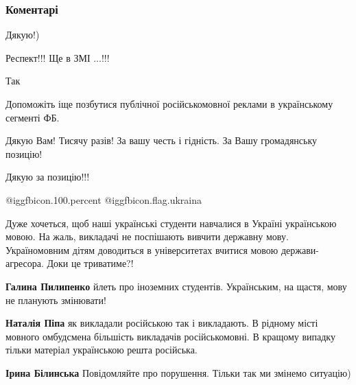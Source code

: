  
 
 
 
 
\subsubsection{Коментарі}

\begin{itemize} %
Дякую!)

Респект!!! Ще в ЗМІ ...!!!


Так


Допоможіть іще позбутися публічної російськомовної реклами в українському сегменті ФБ.


Дякую Вам! Тисячу разів! За вашу честь і гідність. За Вашу громадянську
позицію!

Дякую за позицію!!!

 @igg{fbicon.100.percent}   @igg{fbicon.flag.ukraina}


Дуже хочеться, щоб наші українські студенти навчалися в Україні українською
мовою. На жаль, викладачі не поспішають вивчити державну мову. Україномовним
дітям доводиться в університетах вчитися мовою держави-агресора. Доки це
триватиме?!

\begin{itemize} %
\textbf{Галина Пилипенко} йлеть про іноземних студентів. Українським, на щастя, мову не планують змінювати!

\begin{itemize} %
\textbf{Наталія Піпа} як викладали російською так і викладають. В рідному місті мовного омбудсмена більшість викладачів російськомовні. В кращому випадку тільки матеріал українською решта російська.

\textbf{Ірина Білинська} Повідомляйте про порушення.
Тільки так ми змінемо ситуацію)


\end{itemize}
\end{itemize}
\end{itemize}
